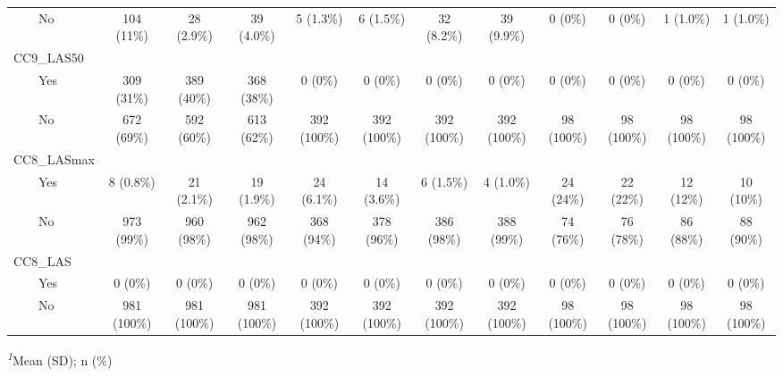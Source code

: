 \begin{table}
\begin{tabular*}{\linewidth}{@{\extracolsep{\fill}}lccccccccccc}
    No & 104 (11\%) & 28 (2.9\%) & 39 (4.0\%) & 5 (1.3\%) & 6 (1.5\%) & 32 (8.2\%) & 39 (9.9\%) & 0 (0\%) & 0 (0\%) & 1 (1.0\%) & 1 (1.0\%) \\ 
CC9\_LAS50 &  &  &  &  &  &  &  &  &  &  &  \\ 
    Yes & 309 (31\%) & 389 (40\%) & 368 (38\%) & 0 (0\%) & 0 (0\%) & 0 (0\%) & 0 (0\%) & 0 (0\%) & 0 (0\%) & 0 (0\%) & 0 (0\%) \\ 
    No & 672 (69\%) & 592 (60\%) & 613 (62\%) & 392 (100\%) & 392 (100\%) & 392 (100\%) & 392 (100\%) & 98 (100\%) & 98 (100\%) & 98 (100\%) & 98 (100\%) \\ 
CC8\_LASmax &  &  &  &  &  &  &  &  &  &  &  \\ 
    Yes & 8 (0.8\%) & 21 (2.1\%) & 19 (1.9\%) & 24 (6.1\%) & 14 (3.6\%) & 6 (1.5\%) & 4 (1.0\%) & 24 (24\%) & 22 (22\%) & 12 (12\%) & 10 (10\%) \\ 
    No & 973 (99\%) & 960 (98\%) & 962 (98\%) & 368 (94\%) & 378 (96\%) & 386 (98\%) & 388 (99\%) & 74 (76\%) & 76 (78\%) & 86 (88\%) & 88 (90\%) \\ 
CC8\_LAS &  &  &  &  &  &  &  &  &  &  &  \\ 
    Yes & 0 (0\%) & 0 (0\%) & 0 (0\%) & 0 (0\%) & 0 (0\%) & 0 (0\%) & 0 (0\%) & 0 (0\%) & 0 (0\%) & 0 (0\%) & 0 (0\%) \\ 
    No & 981 (100\%) & 981 (100\%) & 981 (100\%) & 392 (100\%) & 392 (100\%) & 392 (100\%) & 392 (100\%) & 98 (100\%) & 98 (100\%) & 98 (100\%) & 98 (100\%) \\ 
\bottomrule
\end{tabular*}
\begin{minipage}{\linewidth}
\textsuperscript{\textit{1}}Mean (SD); n (\%)\\
\end{minipage}
\end{table}

